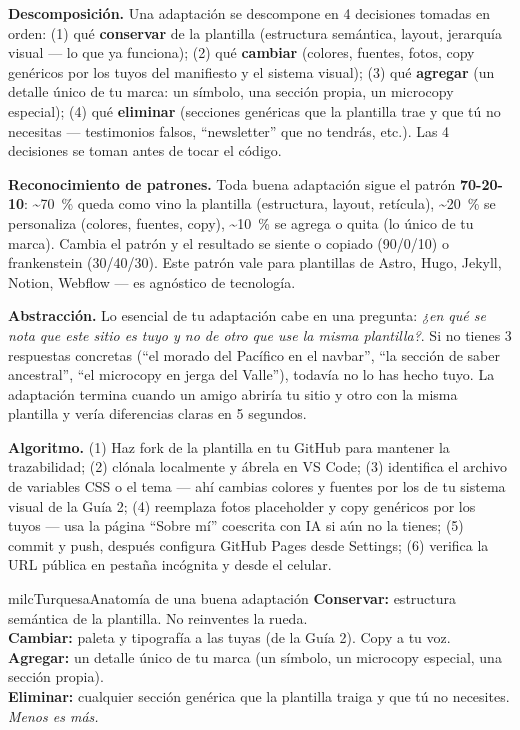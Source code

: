 \documentclass[11pt,letterpaper]{article}
\newcommand{\milcpaso}[3]{%
\Needspace{4\baselineskip}%
\begin{tcolorbox}[enhanced,colback=white,colframe=milcLinea,arc=1.5mm,boxrule=.9pt,
  left=14mm,right=4mm,top=3mm,bottom=3mm,before skip=4pt,after skip=4pt,
  fontupper=\RaggedRight,
  overlay={\node[anchor=north west,circle,fill=#2,text=white,inner sep=0pt,
    minimum size=7.4mm,font=\sffamily\bfseries\small]
    at ([xshift=3.6mm,yshift=-3.2mm]frame.north west) {#1};}]
#3
\end{tcolorbox}}
\begin{document}
\milcpaso{1}{milcTurquesa}{\textbf{Descomposición.} Una adaptación se descompone en 4 decisiones tomadas en orden: (1) qué \textbf{conservar} de la plantilla (estructura semántica, layout, jerarquía visual --- lo que ya funciona); (2) qué \textbf{cambiar} (colores, fuentes, fotos, copy genéricos por los tuyos del manifiesto y el sistema visual); (3) qué \textbf{agregar} (un detalle único de tu marca: un símbolo, una sección propia, un microcopy especial); (4) qué \textbf{eliminar} (secciones genéricas que la plantilla trae y que tú no necesitas --- testimonios falsos, ``newsletter'' que no tendrás, etc.). Las 4 decisiones se toman antes de tocar el código.}
\milcpaso{2}{milcTurquesa}{\textbf{Reconocimiento de patrones.} Toda buena adaptación sigue el patrón \textbf{70-20-10}: \textasciitilde 70~\% queda como vino la plantilla (estructura, layout, retícula), \textasciitilde 20~\% se personaliza (colores, fuentes, copy), \textasciitilde 10~\% se agrega o quita (lo único de tu marca). Cambia el patrón y el resultado se siente o copiado (90/0/10) o frankenstein (30/40/30). Este patrón vale para plantillas de Astro, Hugo, Jekyll, Notion, Webflow --- es agnóstico de tecnología.}
\milcpaso{3}{milcTurquesa}{\textbf{Abstracción.} Lo esencial de tu adaptación cabe en una pregunta: \emph{¿en qué se nota que este sitio es tuyo y no de otro que use la misma plantilla?}. Si no tienes 3 respuestas concretas (``el morado del Pacífico en el navbar'', ``la sección de saber ancestral'', ``el microcopy en jerga del Valle''), todavía no lo has hecho tuyo. La adaptación termina cuando un amigo abriría tu sitio y otro con la misma plantilla y vería diferencias claras en 5 segundos.}
\milcpaso{4}{milcTurquesa}{\textbf{Algoritmo.} (1) Haz fork de la plantilla en tu GitHub para mantener la trazabilidad; (2) clónala localmente y ábrela en VS Code; (3) identifica el archivo de variables CSS o el tema --- ahí cambias colores y fuentes por los de tu sistema visual de la Guía 2; (4) reemplaza fotos placeholder y copy genéricos por los tuyos --- usa la página ``Sobre mí'' coescrita con IA si aún no la tienes; (5) commit y push, después configura GitHub Pages desde Settings; (6) verifica la URL pública en pestaña incógnita y desde el celular.}

\begin{drawbox}{milcTurquesa}{Anatomía de una buena adaptación}
\textbf{Conservar:} estructura semántica de la plantilla. No reinventes la rueda. \\[1mm] \textbf{Cambiar:} paleta y tipografía a las tuyas (de la Guía 2). Copy a tu voz. \\[1mm] \textbf{Agregar:} un detalle único de tu marca (un símbolo, un microcopy especial, una sección propia). \\[1mm] \textbf{Eliminar:} cualquier sección genérica que la plantilla traiga y que tú no necesites. \emph{Menos es más.}
\end{drawbox}
\end{document}
